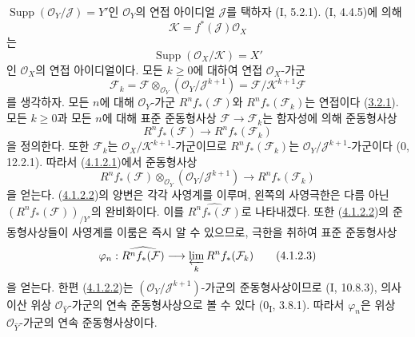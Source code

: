 \begin{env}[4.1.2]
\label{III.4.1.2-fr}
$\operatorname{Supp}(\mathcal O_Y/\mathcal J)=Y'$인
$\mathcal O_Y$의 연접 아이디얼 $\mathcal J$를 택하자 (I, 5.2.1).
(I, 4.4.5)에 의해
\[
\mathcal K=f^*(\mathcal J)\mathcal O_X
\]
는
\[
\operatorname{Supp}(\mathcal O_X/\mathcal K)=X'
\]
인 $\mathcal O_X$의 연접 아이디얼이다. 모든 $k\geq0$에 대하여 연접
$\mathcal O_X$-가군
\[
\mathcal F_k
=\mathcal F\otimes_{\mathcal O_Y}(\mathcal O_Y/\mathcal J^{k+1})
=\mathcal F/\mathcal K^{k+1}\mathcal F
\]
를 생각하자. 모든 $n$에 대해 $\mathcal O_Y$-가군
$R^nf_*(\mathcal F)$와 $R^nf_*(\mathcal F_k)$는 연접이다
(\hyperref[III.3.2.1-fr]{3.2.1}). 모든 $k\geq0$과 모든 $n$에 대해
표준 준동형사상 $\mathcal F\to\mathcal F_k$는 함자성에 의해
준동형사상
\[
R^nf_*(\mathcal F)\longrightarrow R^nf_*(\mathcal F_k)
\tag{4.1.2.1}\label{III.4.1.2.1-fr}
\]
을 정의한다. 또한 $\mathcal F_k$는
$\mathcal O_X/\mathcal K^{k+1}$-가군이므로
$R^nf_*(\mathcal F_k)$는
$\mathcal O_Y/\mathcal J^{k+1}$-가군이다 (0, 12.2.1). 따라서
(\hyperref[III.4.1.2.1-fr]{4.1.2.1})에서 준동형사상
\[
R^nf_*(\mathcal F)\otimes_{\mathcal O_Y}
(\mathcal O_Y/\mathcal J^{k+1})
\longrightarrow R^nf_*(\mathcal F_k)
\tag{4.1.2.2}\label{III.4.1.2.2-fr}
\]
을 얻는다. (\hyperref[III.4.1.2.2-fr]{4.1.2.2})의 양변은 각각
사영계를 이루며, 왼쪽의 사영극한은 다름 아닌
$(R^nf_*(\mathcal F))_{/Y'}$의 완비화이다. 이를
$\widehat{R^nf_*(\mathcal F)}$로 나타내겠다. 또한
(\hyperref[III.4.1.2.2-fr]{4.1.2.2})의 준동형사상들이 사영계를
이룸은 즉시 알 수 있으므로, 극한을 취하여 표준 준동형사상
\[
\varphi_n:\widehat{R^nf_*(\mathcal F)}
\longrightarrow\varprojlim_kR^nf_*(\mathcal F_k)
\tag{4.1.2.3}\label{III.4.1.2.3-fr}
\]
을 얻는다. 한편 (\hyperref[III.4.1.2.2-fr]{4.1.2.2})는
$(\mathcal O_Y/\mathcal J^{k+1})$-가군의 준동형사상이므로
(I, 10.8.3), 의사이산 위상
$\mathcal O_{\widehat Y}$-가군의 연속 준동형사상으로 볼 수 있다
(0\textsubscript{I}, 3.8.1). 따라서 $\varphi_n$은 위상
$\mathcal O_{\widehat Y}$-가군의 연속 준동형사상이다.
\end{env}

